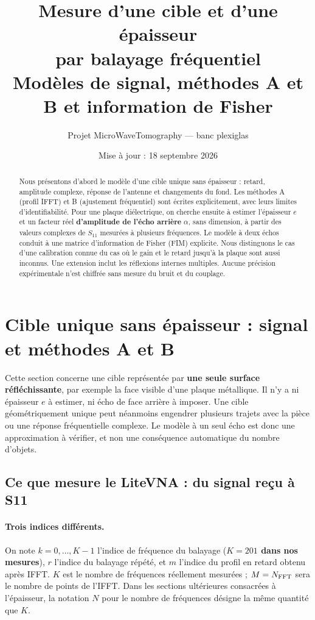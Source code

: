 \documentclass[11pt,a4paper]{article}
\title{Mesure d'une cible et d'une épaisseur\\par balayage fréquentiel\\
Modèles de signal, méthodes A et B et information de Fisher}
\author{Projet MicroWaveTomography --- banc plexiglas}
\date{Mise à jour : 18 septembre 2026}
\begin{document}
\maketitle

\begin{abstract}
Nous présentons d'abord le modèle d'une cible unique sans épaisseur :
retard, amplitude complexe, réponse de l'antenne et changements du fond.
Les méthodes A (profil IFFT) et B (ajustement fréquentiel) sont écrites
explicitement, avec leurs limites d'identifiabilité.
Pour une plaque diélectrique, on cherche ensuite à estimer l'épaisseur $e$ et un facteur réel
\textbf{d'amplitude de l'écho arrière} $\alpha$, sans dimension, à partir
des valeurs complexes de $S_{11}$ mesurées à plusieurs fréquences.
Le modèle à deux échos conduit à une matrice d'information de Fisher (FIM)
explicite. Nous distinguons le cas d'une calibration connue du cas où le
gain et le retard jusqu'à la plaque sont aussi inconnus. Une extension
inclut les réflexions internes multiples. Aucune précision expérimentale
n'est chiffrée sans mesure du bruit et du couplage.
\end{abstract}

\section{Cible unique sans épaisseur : signal et méthodes A et B}
\label{sec:cible-unique}

Cette section concerne une cible représentée par \textbf{une seule surface
réfléchissante}, par exemple la face visible d'une plaque métallique.
Il n'y a ni épaisseur $e$ à estimer, ni écho de face arrière à imposer.
Une cible géométriquement unique peut néanmoins engendrer plusieurs trajets
avec la pièce ou une réponse fréquentielle complexe. Le modèle à un seul
écho est donc une approximation à vérifier, et non une conséquence automatique
du nombre d'objets.

\subsection{Ce que mesure le LiteVNA : du signal reçu à S11}
\label{sec:s11-acquisition}

\paragraph{Trois indices différents.}
On note $k=0,\ldots,K-1$ l'indice de fréquence du balayage
(\textbf{$K=201$ dans nos mesures}), $r$ l'indice du balayage répété,
et $m$ l'indice du profil en retard obtenu après IFFT. $K$ est le nombre
de fréquences réellement mesurées ; $M=N_{\rm FFT}$ sera le nombre de
points de l'IFFT. Dans les sections ultérieures consacrées à l'épaisseur,
la notation $N$ pour le nombre de fréquences désigne la même quantité que $K$.
\end{document}
